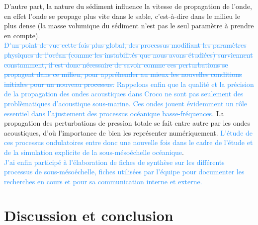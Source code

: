 \documentclass{rapportECC}
\newcommand{\FAadd}[1]{\textcolor{DodgerBlue}{{#1}}}                     %
\newcommand{\FAdel}[1]{\textcolor{DodgerBlue}{\sout{#1}}}                %
\begin{document}
D'autre part, la nature du sédiment influence la vitesse de propagation de l'onde, en effet l'onde se propage plus vite dans le sable, c'est-à-dire dans le milieu le plus dense (la masse volumique du sédiment n'est pas le seul paramètre à prendre en compte).\\
\FAdel{D'un point de vue cette fois plus global, des processus modifiant les paramètres physiques de l'océan (comme les instabilités que nous avons étudiées) surviennent constamment, il est donc nécessaire de savoir comme ces perturbations se propagent dans ce milieu, pour appréhender au mieux les nouvelles conditions initiales pour un nouveau processus.}
\FAadd{Rappelons enfin que la qualité et la précision de la propagation des ondes acoustiques dans Croco ne sont pas seulement des problèmatiques d'acoustique sous-marine. Ces ondes jouent évidemment un rôle essentiel dans l'ajustement des processus océanique basse-fréquences.} La propagation des perturbations de pression totale se fait entre autre par les ondes acoustiques, d'où l'importance de bien les représenter numériquement. \FAadd{L'étude de ces processus ondulatoires entre donc une nouvelle fois dans le cadre de l'étude et de la simulation explicite de la sous-mésoéchelle océanique}.\\
\FAadd{J'ai enfin participé à l'élaboration de fiches de synthèse sur les différents processus de sous-mésoéchelle, fiches utilisées par l'équipe pour documenter les recherches en cours et pour sa communication interne et externe.}\\


\section{Discussion et conclusion}
\end{document}
